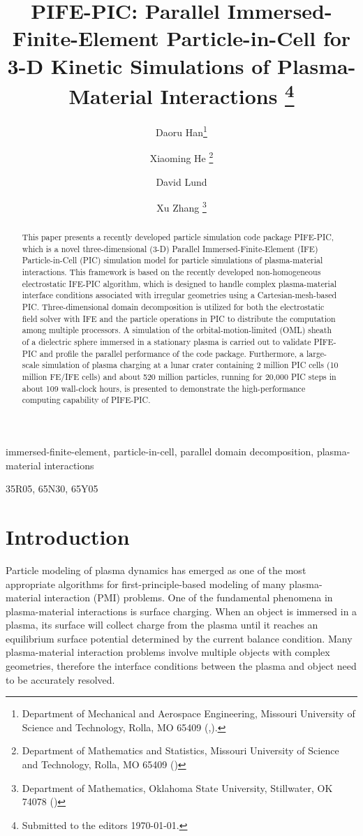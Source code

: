 \documentclass{siamart171218}
\title{PIFE-PIC: Parallel Immersed-Finite-Element Particle-in-Cell
for 3-D Kinetic Simulations of Plasma-Material Interactions%
\thanks{%
Submitted to the editors \today.
\funding{This work was financially supported in part by
NASA-Missouri Space Grant Consortium through NASA-EPSCoR-Missouri,
and NSF through grants DMS-2005272 and OAC-1919789. %
D. Lund was also supported in part by NASA-Missouri Space Grant Consortium Scholarships.
} %
} %
} %
\author{
Daoru Han\footnotemark[2]%
\thanks{Department of Mechanical and Aerospace Engineering,
Missouri University of Science and Technology, Rolla, MO 65409
(\email{handao@mst.edu},\email{dclgzb@mst.edu}).}
\and
Xiaoming He%
\thanks{Department of Mathematics and Statistics,
Missouri University of Science and Technology, Rolla, MO 65409 (\email{hex@mst.edu})}
\and
David Lund\footnotemark[2]%
\and
Xu Zhang%
\thanks{Department of Mathematics, Oklahoma State University,
Stillwater, OK 74078 (\email{xzhang@okstate.edu})}}
\begin{document}
\newcommand{\BibTeX}{{\scshape Bib}\TeX\xspace}
\maketitle
\begin{abstract}
This paper presents a recently developed particle simulation code package PIFE-PIC,
which is a novel three-dimensional (3-D)
Parallel Immersed-Finite-Element (IFE) Particle-in-Cell (PIC) simulation model
for particle simulations of plasma-material interactions.
This framework is based on the recently developed non-homogeneous
electrostatic IFE-PIC algorithm,
which is designed to handle complex plasma-material interface conditions
associated with irregular geometries using a Cartesian-mesh-based PIC.
Three-dimensional domain decomposition is utilized
for both the electrostatic field solver with IFE
and the particle operations in PIC
to distribute the computation among multiple processors.
A simulation of the orbital-motion-limited (OML) sheath of a dielectric sphere
immersed in a stationary plasma is carried out to validate PIFE-PIC
and profile the parallel performance of the code package.
Furthermore, a large-scale simulation
of plasma charging at a lunar crater
containing 2 million PIC cells (10 million FE/IFE cells)
and about 520 million particles,
running for 20,000 PIC steps in about 109 wall-clock hours,
is presented to demonstrate the high-performance computing capability of PIFE-PIC.

\end{abstract}

\begin{keywords}
	immersed-finite-element,
	particle-in-cell,
    parallel domain decomposition,
	plasma-material interactions
\end{keywords}

\begin{AMS}
	35R05, 65N30, 65Y05
\end{AMS}


\section{Introduction}
\label{sec:intro}


Particle modeling of plasma dynamics has emerged as one of the most
appropriate algorithms for first-principle-based modeling
of many plasma-material interaction (PMI)
problems.
One of the fundamental phenomena in plasma-material interactions is surface charging.
When an object is immersed in a plasma,
its surface will collect charge from the plasma
until it reaches an equilibrium surface potential determined by the current balance condition.
Many plasma-material interaction problems involve multiple objects with complex geometries,
therefore the interface conditions between the plasma and object need to be accurately resolved.
\end{document}
